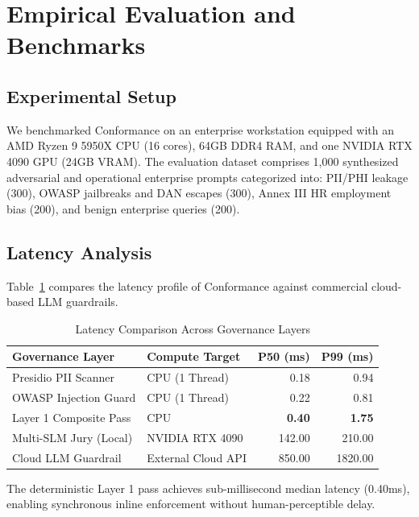 \documentclass[conference,10pt]{IEEEtran}
\begin{document}
\section{Empirical Evaluation and Benchmarks}
\label{sec:eval}

\subsection{Experimental Setup}
We benchmarked Conformance on an enterprise workstation equipped with an AMD Ryzen 9 5950X CPU (16 cores), 64GB DDR4 RAM, and one NVIDIA RTX 4090 GPU (24GB VRAM). The evaluation dataset comprises 1,000 synthesized adversarial and operational enterprise prompts categorized into: PII/PHI leakage (300), OWASP jailbreaks and DAN escapes (300), Annex III HR employment bias (200), and benign enterprise queries (200).

\subsection{Latency Analysis}
Table~\ref{tab:latency} compares the latency profile of Conformance against commercial cloud-based LLM guardrails.

\begin{table}[h]
\caption{Latency Comparison Across Governance Layers}
\label{tab:latency}
\centering
\begin{tabular}{@{}llrr@{}}
\toprule
\textbf{Governance Layer} & \textbf{Compute Target} & \textbf{P50 (ms)} & \textbf{P99 (ms)} \\ \midrule
Presidio PII Scanner & CPU (1 Thread) & 0.18 & 0.94 \\
OWASP Injection Guard & CPU (1 Thread) & 0.22 & 0.81 \\
Layer 1 Composite Pass & CPU & \textbf{0.40} & \textbf{1.75} \\
Multi-SLM Jury (Local) & NVIDIA RTX 4090 & 142.00 & 210.00 \\
Cloud LLM Guardrail & External Cloud API & 850.00 & 1820.00 \\ \bottomrule
\end{tabular}
\end{table}

The deterministic Layer 1 pass achieves sub-millisecond median latency (0.40ms), enabling synchronous inline enforcement without human-perceptible delay.
\end{document}
